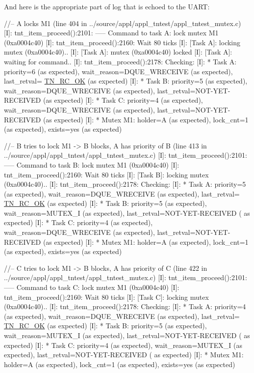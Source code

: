 And here is the appropriate part of log that is echoed to the U\+A\+R\+T\+:


\begin{DoxyCode}
\textcolor{comment}{//-- A locks M1 (line 404 in ../source/appl/appl\_tntest/appl\_tntest\_mutex.c) }
[I]: tnt\_item\_proceed():2101: ----- Command to task A: lock mutex M1 (0xa0004c40) 
[I]: tnt\_item\_proceed():2160: Wait 80 ticks 
[I]: [Task A]: locking mutex (0xa0004c40).. 
[I]: [Task A]: mutex (0xa0004c40) locked 
[I]: [Task A]: waiting for command.. 
[I]: tnt\_item\_proceed():2178: Checking: 
[I]: * Task A: priority=6 (as expected), wait\_reason=DQUE\_WRECEIVE (as expected), last\_retval=
      \hyperlink{tn__common_8h_aa43bd3da1ad4c1e61224b5f23b369876afb291924237186f5765865256c75e639}{TN\_RC\_OK} (as expected) 
[I]: * Task B: priority=5 (as expected), wait\_reason=DQUE\_WRECEIVE (as expected), last\_retval=NOT-YET-
      RECEIVED (as expected) 
[I]: * Task C: priority=4 (as expected), wait\_reason=DQUE\_WRECEIVE (as expected), last\_retval=NOT-YET-
      RECEIVED (as expected) 
[I]: * Mutex M1: holder=A (as expected), lock\_cnt=1 (as expected), exists=yes (as expected) 

\textcolor{comment}{//-- B tries to lock M1 -> B blocks, A has priority of B (line 413 in
       ../source/appl/appl\_tntest/appl\_tntest\_mutex.c) }
[I]: tnt\_item\_proceed():2101: ----- Command to task B: lock mutex M1 (0xa0004c40) 
[I]: tnt\_item\_proceed():2160: Wait 80 ticks 
[I]: [Task B]: locking mutex (0xa0004c40).. 
[I]: tnt\_item\_proceed():2178: Checking: 
[I]: * Task A: priority=5 (as expected), wait\_reason=DQUE\_WRECEIVE (as expected), last\_retval=
      \hyperlink{tn__common_8h_aa43bd3da1ad4c1e61224b5f23b369876afb291924237186f5765865256c75e639}{TN\_RC\_OK} (as expected) 
[I]: * Task B: priority=5 (as expected), wait\_reason=MUTEX\_I (as expected), last\_retval=NOT-YET-RECEIVED (
      as expected) 
[I]: * Task C: priority=4 (as expected), wait\_reason=DQUE\_WRECEIVE (as expected), last\_retval=NOT-YET-
      RECEIVED (as expected) 
[I]: * Mutex M1: holder=A (as expected), lock\_cnt=1 (as expected), exists=yes (as expected) 

\textcolor{comment}{//-- C tries to lock M1 -> B blocks, A has priority of C (line 422 in
       ../source/appl/appl\_tntest/appl\_tntest\_mutex.c) }
[I]: tnt\_item\_proceed():2101: ----- Command to task C: lock mutex M1 (0xa0004c40) 
[I]: tnt\_item\_proceed():2160: Wait 80 ticks 
[I]: [Task C]: locking mutex (0xa0004c40).. 
[I]: tnt\_item\_proceed():2178: Checking: 
[I]: * Task A: priority=4 (as expected), wait\_reason=DQUE\_WRECEIVE (as expected), last\_retval=
      \hyperlink{tn__common_8h_aa43bd3da1ad4c1e61224b5f23b369876afb291924237186f5765865256c75e639}{TN\_RC\_OK} (as expected) 
[I]: * Task B: priority=5 (as expected), wait\_reason=MUTEX\_I (as expected), last\_retval=NOT-YET-RECEIVED (
      as expected) 
[I]: * Task C: priority=4 (as expected), wait\_reason=MUTEX\_I (as expected), last\_retval=NOT-YET-RECEIVED (
      as expected) 
[I]: * Mutex M1: holder=A (as expected), lock\_cnt=1 (as expected), exists=yes (as expected) 


\end{DoxyCode}
